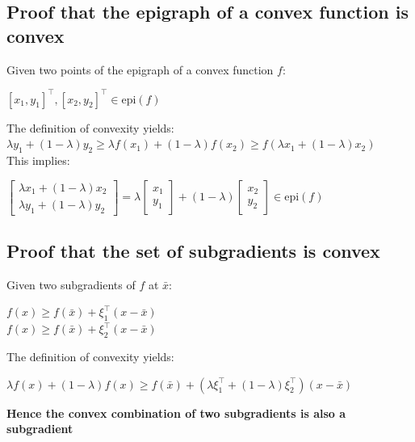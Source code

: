 \documentclass[english]{latex4ei/latex4ei_sheet}
\begin{document}
\begin{sectionbox}
	\subsection{Proof that the epigraph of a convex function is convex}
	Given two points of the epigraph of a convex function $f$: \\
	\begin{center}
		$[x_1, y_1]^\intercal, [x_2, y_2]^\intercal \in \text{epi}(f)$
	\end{center}
	The definition of convexity yields: \\
	$\lambda y_1 + (1 - \lambda)y_2 \geq \lambda f(x_1) + (1 - \lambda)f(x_2) \geq f(\lambda x_1 + (1-\lambda) x_2)$ \\
	This implies: \\
	\begin{center}
		$\begin{bmatrix}
			\lambda x_1 + (1-\lambda) x_2 \\
			\lambda y_1 + (1-\lambda) y_2
		\end{bmatrix} = \lambda\begin{bmatrix}
			x_1 \\
			y_1
	\end{bmatrix} + (1-\lambda) \begin{bmatrix}
			x_2 \\
			y_2
	\end{bmatrix} \in \text{epi}(f)$
	\end{center}
\end{sectionbox}

\begin{sectionbox}
	\subsection{Proof that the set of subgradients is convex}
	Given two subgradients of $f$ at $\bar{x}$: \\
	\begin{center}
		$f(x) \geq f(\bar{x}) + \xi_1^\intercal(x - \bar{x})$ \\
		$f(x) \geq f(\bar{x}) + \xi_2^\intercal(x - \bar{x})$
	\end{center}
	The definition of convexity yields: \\
	\begin{center}
		$\lambda f(x) + (1-\lambda)f(x) \geq f(\bar{x}) + (\lambda\xi_1^\intercal + (1-\lambda)\xi_2^\intercal)(x - \bar{x})$
	\end{center}
	\textbf{Hence the convex combination of two subgradients is also a subgradient}
\end{sectionbox}
\end{document}
